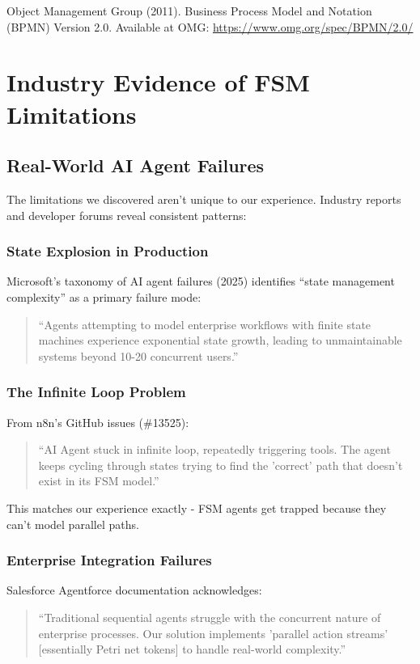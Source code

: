 \documentclass[11pt,a4paper]{article}
\begin{document}
Object Management Group (2011). Business Process Model and Notation (BPMN) Version 2.0. Available at OMG: \url{https://www.omg.org/spec/BPMN/2.0/}

\appendix

\section{Industry Evidence of FSM Limitations}

\subsection{Real-World AI Agent Failures}

The limitations we discovered aren't unique to our experience. Industry reports and developer forums reveal consistent patterns:

\subsubsection{State Explosion in Production}

Microsoft's taxonomy of AI agent failures (2025) identifies ``state management complexity'' as a primary failure mode:
\begin{quote}
``Agents attempting to model enterprise workflows with finite state machines experience exponential state growth, leading to unmaintainable systems beyond 10-20 concurrent users.''
\end{quote}

\subsubsection{The Infinite Loop Problem}

From n8n's GitHub issues (\#13525):
\begin{quote}
``AI Agent stuck in infinite loop, repeatedly triggering tools. The agent keeps cycling through states trying to find the 'correct' path that doesn't exist in its FSM model.''
\end{quote}

This matches our experience exactly - FSM agents get trapped because they can't model parallel paths.

\subsubsection{Enterprise Integration Failures}

Salesforce Agentforce documentation acknowledges:
\begin{quote}
``Traditional sequential agents struggle with the concurrent nature of enterprise processes. Our solution implements 'parallel action streams' [essentially Petri net tokens] to handle real-world complexity.''
\end{quote}
\end{document}
